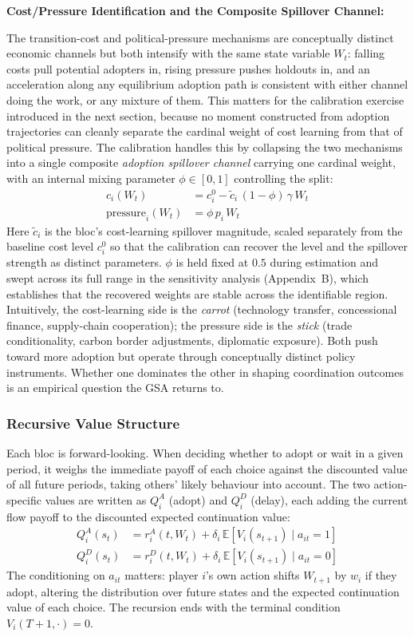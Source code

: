 \documentclass[10pt,a4paper]{article}
\newcommand{\bpar}[1]{%
  \par\addvspace{\medskipamount}%
  \needspace{4\baselineskip}%
  \noindent\textbf{#1}\par\nopagebreak[4]%
}
\begin{document}
\bpar{Cost/Pressure Identification and the Composite Spillover Channel:}
The transition-cost and political-pressure mechanisms are conceptually distinct economic
channels but both intensify with the same state variable $W_t$: falling costs pull potential
adopters in, rising pressure pushes holdouts in, and an acceleration along any equilibrium
adoption path is consistent with either channel doing the work, or any mixture of them. This
matters for the calibration exercise introduced in the next section, because no moment
constructed from adoption trajectories can cleanly separate the cardinal weight of cost learning
from that of political pressure. The calibration handles this by collapsing the two mechanisms
into a single composite \textit{adoption spillover channel} carrying one cardinal weight, with
an internal mixing parameter $\phi \in [0,1]$ controlling the split:
\begin{align*}
c_i(W_t) &= c_i^0 - \tilde{c}_i\,(1 - \phi)\,\gamma\,W_t \\
\text{pressure}_i(W_t) &= \phi\, p_i\, W_t
\end{align*}
Here $\tilde{c}_i$ is the bloc's cost-learning spillover magnitude, scaled separately from the
baseline cost level $c_i^0$ so that the calibration can recover the level and the spillover
strength as distinct parameters. $\phi$ is held fixed at $0.5$ during estimation and swept across
its full range in the sensitivity analysis (Appendix~B), which establishes that the recovered
weights are stable across the identifiable region. Intuitively, the cost-learning side is the
\textit{carrot} (technology transfer, concessional finance, supply-chain cooperation); the
pressure side is the \textit{stick} (trade conditionality, carbon border adjustments, diplomatic
exposure). Both push toward more adoption but operate through conceptually distinct policy
instruments. Whether one dominates the other in shaping coordination outcomes is an empirical
question the GSA returns to.

\needspace{12em}
\subsubsection*{Recursive Value Structure}

Each bloc is forward-looking. When deciding whether to adopt or wait in a given period, it weighs
the immediate payoff of each choice against the discounted value of all future periods, taking
others' likely behaviour into account. The two action-specific values are written as $Q_i^A$
(adopt) and $Q_i^D$ (delay), each adding the current flow payoff to the discounted expected
continuation value:
\begin{align*}
Q_i^A(s_t) &= r_i^A(t, W_t) + \delta_i\, \mathbb{E}[V_i(s_{t+1}) \mid a_{it} = 1] \\
Q_i^D(s_t) &= r_i^D(t, W_t) + \delta_i\, \mathbb{E}[V_i(s_{t+1}) \mid a_{it} = 0]
\end{align*}
The conditioning on $a_{it}$ matters: player $i$'s own action shifts $W_{t+1}$ by $w_i$ if
they adopt, altering the distribution over future states and the expected continuation value
of each choice. The recursion ends with the terminal condition $V_i(T+1, \cdot) = 0$.
\end{document}
